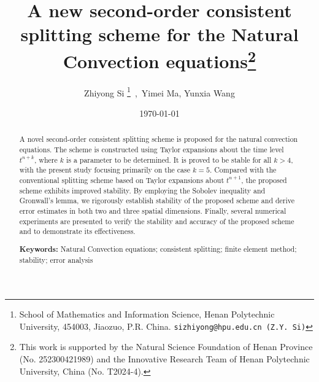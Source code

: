 \documentclass[10pt]{article}
\begin{document}
	\date{\today}
	\title{\bf A new second-order consistent splitting scheme for the Natural Convection equations\thanks{This work is supported by the Natural Science Foundation of Henan Province (No. 252300421989) and the Innovative Research Team of Henan Polytechnic University, China (No. T2024-4).}}
	\author{Zhiyong Si
		\footnote{School of Mathematics and Information Science, Henan Polytechnic University, 454003, Jiaozuo, P.R. China. {\tt sizhiyong@hpu.edu.cn (Z.Y. Si)}
		}\, ,\, Yimei Ma\footnotemark[2], Yunxia Wang\footnotemark[2]}
	\maketitle %
	\begin{abstract}
		A novel second-order consistent splitting scheme is proposed for the natural convection equations. The scheme is constructed using Taylor expansions about the time level $t^{n+k}$, where $k$ is a parameter to be determined. It is proved to be stable for all 
		$k>4$, with the present study focusing primarily on the case $k=5$. Compared with the conventional splitting scheme based on Taylor expansions about $t^{n+1}$, the proposed scheme exhibits improved stability. By employing the Sobolev inequality and Gronwall's lemma, we rigorously establish stability of the proposed scheme and derive error estimates in both two and three spatial dimensions. Finally, several numerical experiments are presented to verify the stability and accuracy of the proposed scheme and to demonstrate its effectiveness.
		
		
		\textbf{Keywords:} Natural Convection equations; consistent splitting; finite element method; stability; error analysis
	\end{abstract}
\end{document}
